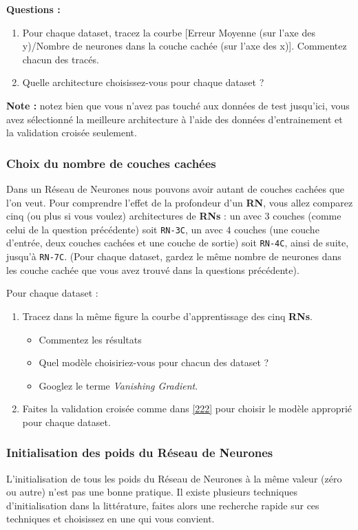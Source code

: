 \documentclass[latter,12pt]{article}
\begin{document}
\textbf{Questions :}

\begin{enumerate}
\item Pour chaque dataset, tracez la courbe [Erreur Moyenne (sur l'axe des y)/Nombre de neurones dans la couche cachée (sur l'axe des x)]. Commentez chacun des tracés.
\item Quelle architecture choisissez-vous pour chaque dataset ?
\end{enumerate}

\textbf{Note :} notez bien que vous n'avez pas touché aux données de test jusqu'ici, vous avez sélectionné la meilleure architecture à l'aide des données d'entrainement et la validation croisée seulement.

\subsubsection{Choix du nombre de couches cachées}
Dans un Réseau de Neurones nous pouvons avoir autant de couches cachées que l'on veut. Pour comprendre l'effet de la profondeur d'un \textbf{RN}, vous allez comparez cinq (ou plus si vous voulez) architectures de \textbf{RNs} : un avec $3$ couches (comme celui de la question précédente) soit \verb!RN-3C!, un avec $4$ couches (une couche d'entrée, deux couches cachées et une couche de sortie) soit \verb!RN-4C!, ainsi de suite, jusqu'à \verb!RN-7C!. (Pour chaque dataset, gardez le même nombre de neurones dans les couche cachée que vous avez trouvé dans la questions précédente).

Pour chaque dataset :
\begin{enumerate}
\item Tracez dans la même figure la courbe d'apprentissage des cinq \textbf{RNs}.
	\begin{itemize}
	\item Commentez les résultats
	\item Quel modèle choisiriez-vous pour chacun des dataset ?
	\item Googlez le terme \textit{Vanishing Gradient}.
	\end{itemize}

\item Faites la validation croisée comme dans \ref{222} pour choisir le modèle approprié pour chaque dataset.
\end{enumerate}


\subsubsection{Initialisation des poids du Réseau de Neurones}
L'initialisation de tous les poids du Réseau de Neurones à la même valeur (zéro ou autre) n'est pas une bonne pratique. Il existe plusieurs techniques d'initialisation dans la littérature, faites alors une recherche rapide sur ces techniques et choisissez en une qui vous convient.
\end{document}
